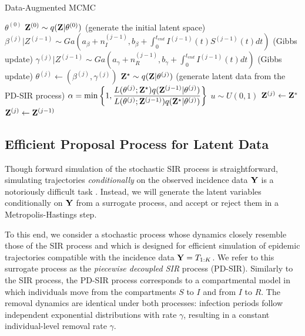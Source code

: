 \documentclass[11pt]{article}
\begin{document}
	\begin{algorithm}
		\caption{Data-Augmented MCMC}
		\label{alg:DA-MCMC}
		\begin{algorithmic}
			\REQUIRE $\theta^{(0)}$
			\STATE $\mathbf{Z}^{(0)} \sim q(\mathbf{Z}|\theta^{(0)})$ (generate the initial latent space)
			\STATE $\beta^{(j)}|Z^{(j - 1)} \sim Ga\left( a_{\beta} + n_I^{(j - 1)}, b_{\beta} + \int_{0}^{t_{end}} I^{(j - 1)}(t)S^{(j - 1)}(t)dt\right)$ (Gibbs update)
			\STATE $\gamma^{(j)}|Z^{(j-1)} \sim Ga\left( a_{\gamma} + n_R^{(j - 1)}, b_{\gamma} + \int_{0}^{t_{end}} I^{(j - 1)}(t) dt\right)$ (Gibbs update)
			\STATE $\theta^{(j)} \leftarrow (\beta^{(j)}, \gamma^{(j)})$
			\STATE $\mathbf{Z}^\star \sim q(\mathbf{Z}|\theta^{(j)})$ (generate latent data from the PD-SIR process)
			\STATE $\alpha = \min\left\lbrace 1, \dfrac{L(\theta^{(j)}; \mathbf{Z}^\star)q(\mathbf{Z}^{(j - 1)}|\theta^{(j)})}{L(\theta^{(j)}; \mathbf{Z}^{(j - 1)})q(\mathbf{Z}^\star|\theta^{(j)})}\right\rbrace  $
			\STATE $u \sim U(0,1)$
			\STATE $\mathbf{Z}^{(j)} \leftarrow \mathbf{Z}^*$			
			\ELSE
			\STATE $\mathbf{Z}^{(j)} \leftarrow \mathbf{Z}^{(j - 1)}$
			\ENDIF
			\ENDFOR
		\end{algorithmic}
	\end{algorithm}
	
	\subsection{Efficient Proposal Process for Latent Data}	\label{sec:pds}
	Though forward simulation of the stochastic SIR process is straightforward, 
	simulating trajectories \textit{conditionally} on the observed incidence data $\mathbf{Y}$ is a notoriously difficult task \cite{Hobolth.2009}. Instead, we will generate the latent variables conditionally on $\mathbf{Y}$ from a surrogate process, and accept or reject them in a Metropolis-Hastings step.
	
	To this end, we consider a stochastic process whose dynamics closely resemble those of the SIR process and which is designed for efficient simulation of epidemic trajectories compatible with the incidence data $\mathbf{Y} = T_{1:K}$. We refer to this surrogate process as the \textit{piecewise decoupled SIR} process (PD-SIR).
	Similarly to the SIR process, the PD-SIR process corresponds to a compartmental model in which individuals move from the compartments $S$ to $I$ and from $I$ to $R$.
	The removal dynamics are identical under both processes: infection periods follow independent exponential distributions with rate $\gamma$, resulting in a constant individual-level removal rate $\gamma$. 
	
\end{document}
